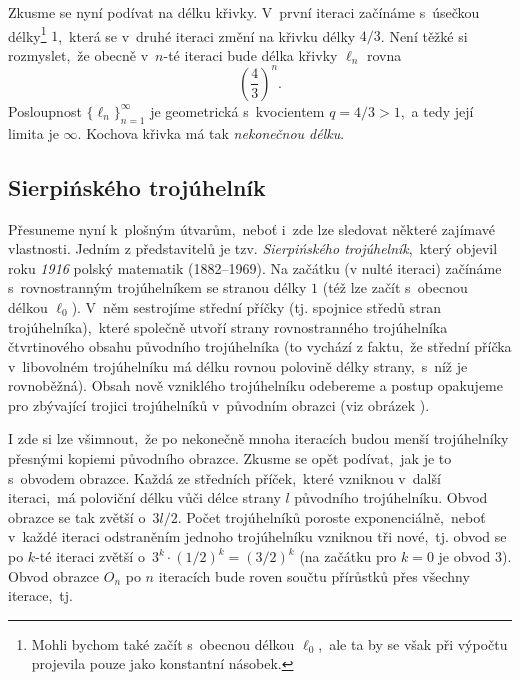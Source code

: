 Zkusme se nyní podívat na délku křivky. V~první iteraci začínáme s~úsečkou délky\footnote{Mohli bychom také začít s~obecnou délkou $\ell_0$,~ale ta by se však při výpočtu projevila pouze jako konstantní násobek.} $1$,~která se v~druhé iteraci změní na křivku délky $4/3$. Není těžké si rozmyslet,~že obecně v~$n$-té iteraci bude délka křivky $\ell_n$ rovna
\begin{equation*}
    \left(\dfrac{4}{3}\right)^{n}.
\end{equation*}
Posloupnost $\{\ell_n\}_{n=1}^{\infty}$ je geometrická s~kvocientem $q=4/3>1$,~a tedy její limita je $\infty$. Kochova křivka má tak \emph{nekonečnou délku}.

\subsection{Sierpińského trojúhelník}\label{subsec:sierpinskeho_trojuhelnik}
Přesuneme nyní k~plošným útvarům,~neboť i~zde lze sledovat některé zajímavé vlastnosti. Jedním z představitelů je tzv. \emph{Sierpińského trojúhelník},~který objevil roku \emph{1916} polský matematik  \mbox{(1882--1969)}. \citep[str. 61]{Peitgen2004} Na začátku (v nulté iteraci) začínáme s~rovnostranným trojúhelníkem se stranou délky $1$ (též lze začít s~obecnou délkou $\ell_0$). V~něm sestrojíme střední příčky (tj. spojnice středů stran trojúhelníka),~které společně utvoří strany rovnostranného trojúhelníka čtvrtinového obsahu původního trojúhelníka (to vychází z faktu,~že střední příčka v~libovolném trojúhelníku má délku rovnou polovině délky strany,~s~níž je rovnoběžná). Obsah nově vzniklého trojúhelníku odebereme a postup opakujeme pro zbývající trojici trojúhelníků v~původním obrazci (viz obrázek ).\par
{}\par
I zde si lze všimnout,~že po nekonečně mnoha iteracích budou menší trojúhelníky přesnými kopiemi původního obrazce. Zkusme se opět podívat,~jak je to s~obvodem obrazce. Každá ze středních příček,~které vzniknou v~další iteraci,~má poloviční délku vůči délce strany $l$ původního trojúhelníku. Obvod obrazce se tak zvětší o~$3l/2$. Počet trojúhelníků poroste exponenciálně,~neboť v~každé iteraci odstraněním jednoho trojúhelníku vzniknou tři nové,~tj. obvod se po $k$-té iteraci zvětší o~$3^k\cdot(1/2)^k=(3/2)^k$ (na začátku pro $k=0$ je obvod $3$). Obvod obrazce $O_n$ po $n$ iteracích bude roven součtu přírůstků přes všechny iterace,~tj.
